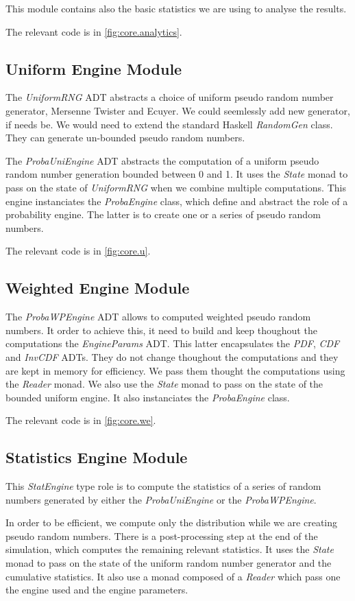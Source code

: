 \documentclass[12pt,a4paper,titlepage]{article}
\begin{document}
This module contains also the basic statistics we are using to 
analyse the results.

The relevant code is in \autoref{fig:core.analytics}.
\subsection{Uniform Engine Module}
\label{ssec:uniform.impl}
The \emph{UniformRNG} ADT abstracts a choice of uniform pseudo random 
number generator, Mersenne Twister and Ecuyer. We could seemlessly
add new generator, if needs be. We would need to extend the standard
Haskell \emph{RandomGen} class. 
They can generate un-bounded pseudo random numbers.

The \emph{ProbaUniEngine} ADT abstracts the computation of a uniform pseudo
random number generation bounded between 0 and 1.
It uses the \emph{State} monad to pass on the state of \emph{UniformRNG}
when we combine multiple computations.
This engine instanciates the \emph{ProbaEngine} class, which define
and abstract the role of a probability engine. The latter is to 
create one or a series of pseudo random numbers.

The relevant code is in \autoref{fig:core.u}.
\subsection{Weighted Engine Module}
\label{ssec:weighted.impl}
The \emph{ProbaWPEngine} ADT allows to computed weighted pseudo
random numbers. It order to achieve this, it need to build and keep
thoughout the computations the \emph{EngineParams} ADT. 
This latter encapsulates the \emph{PDF}, \emph{CDF} and \emph{InvCDF}
ADTs. They do not change thoughout the computations and they are kept 
in memory for efficiency. We pass them thought the computations
using the \emph{Reader} monad. We also use the \emph{State} monad
to pass on the state of the bounded uniform engine.
It also instanciates the \emph{ProbaEngine} class.

The relevant code is in \autoref{fig:core.we}.
\subsection{Statistics Engine Module}
\label{ssec:stats.impl}
This \emph{StatEngine} type role is
to compute the statistics of a series of random numbers generated
by either the \emph{ProbaUniEngine} or the \emph{ProbaWPEngine}.

In order to be efficient, we compute only the distribution while we 
are creating pseudo random numbers. 
There is a post-processing step at the end of the simulation, which 
computes the remaining relevant statistics.
It uses the \emph{State} monad to pass on the state of the 
uniform random number generator and the cumulative statistics.
It also use a monad composed of a \emph{Reader} which
pass one the engine used and the engine parameters. 
\end{document}
